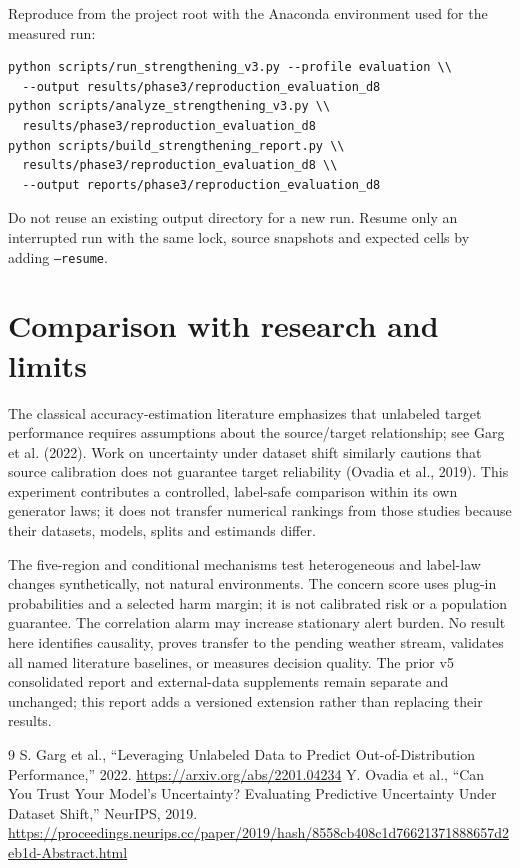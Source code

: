 \documentclass[11pt,a4paper]{article}
\begin{document}
Reproduce from the project root with the Anaconda environment used for the measured run:
\begin{verbatim}
python scripts/run_strengthening_v3.py --profile evaluation \\
  --output results/phase3/reproduction_evaluation_d8
python scripts/analyze_strengthening_v3.py \\
  results/phase3/reproduction_evaluation_d8
python scripts/build_strengthening_report.py \\
  results/phase3/reproduction_evaluation_d8 \\
  --output reports/phase3/reproduction_evaluation_d8
\end{verbatim}
Do not reuse an existing output directory for a new run. Resume only an interrupted run with the same lock, source snapshots and expected cells by adding \texttt{--resume}.

\section{Comparison with research and limits}
The classical accuracy-estimation literature emphasizes that unlabeled target performance requires assumptions about the source/target relationship; see Garg et al. (2022). Work on uncertainty under dataset shift similarly cautions that source calibration does not guarantee target reliability (Ovadia et al., 2019). This experiment contributes a controlled, label-safe comparison within its own generator laws; it does not transfer numerical rankings from those studies because their datasets, models, splits and estimands differ.

The five-region and conditional mechanisms test heterogeneous and label-law changes synthetically, not natural environments. The concern score uses plug-in probabilities and a selected harm margin; it is not calibrated risk or a population guarantee. The correlation alarm may increase stationary alert burden. No result here identifies causality, proves transfer to the pending weather stream, validates all named literature baselines, or measures decision quality. The prior v5 consolidated report and external-data supplements remain separate and unchanged; this report adds a versioned extension rather than replacing their results.

\begin{thebibliography}{9}
S. Garg et al., ``Leveraging Unlabeled Data to Predict Out-of-Distribution Performance,'' 2022. \url{https://arxiv.org/abs/2201.04234}
Y. Ovadia et al., ``Can You Trust Your Model's Uncertainty? Evaluating Predictive Uncertainty Under Dataset Shift,'' NeurIPS, 2019. \url{https://proceedings.neurips.cc/paper/2019/hash/8558cb408c1d76621371888657d2eb1d-Abstract.html}
\end{thebibliography}
\end{document}
